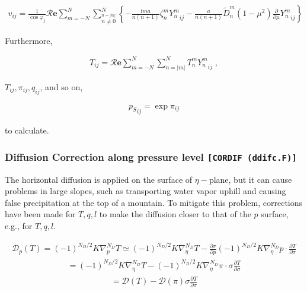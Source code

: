 \begin{eqnarray}
  v_{ij}
  =  \frac{1}{\cos \varphi_j}
     {\mathcal R}{\mathbf{e}} \sum_{m=-N}^{N}
                       \sum_{\stackrel{n=|m|}{n \neq 0}}^{N}
    \left\{
          -  \frac{\mathrm{i}m a}{n(n+1)} \zeta_n^m  {Y_n^m}_{ij}
          -  \frac{a}{n(n+1)} \tilde{D}_n^m
            (1-\mu^{2}) \frac{\partial{}}{\partial {\mu}} {Y_n^m}_{ij}
    \right\}
\end{eqnarray}

Furthermore,

\begin{eqnarray}
  T_{ij}
   =  {\mathcal R}{\mathbf{e}} \sum_{m=-N}^{N} \sum_{n=|m|}^{N}
      T_n^m  {Y_n^m}_{ij} \; ,
\end{eqnarray}

\(T_{ij}, \pi_{ij}, q_{ij}\), and so on,

\begin{eqnarray}
  {p_S}_{ij} = \exp \pi_{ij}
\end{eqnarray}

to calculate.

\hypertarget{diffusion-correction-along-pressure-level-cordif-ddifc.f}{%
\subsubsection{\texorpdfstring{Diffusion Correction along pressure level
\texttt{{[}CORDIF\ (ddifc.F){]}}}{Diffusion Correction along pressure level {[}CORDIF (ddifc.F){]}}}\label{diffusion-correction-along-pressure-level-cordif-ddifc.f}}

The horizontal diffusion is applied on the surface of \(\eta-\)plane,
but it can cause problems in large slopes, such as transporting water
vapor uphill and causing false precipitation at the top of a mountain.
To mitigate this problem, corrections have been made for \(T,q,l\) to
make the diffusion closer to that of the \(p\) surface, e.g., for
\(T,q,l\).

\begin{eqnarray}
  {\mathcal D}_p (T) = (-1)^{N_D/2} K \nabla^{N_D}_p T  
                \simeq  (-1)^{N_D/2} K \nabla^{N_D}_{\eta} T  
                      - \frac{\partial{\sigma}}{\partial {p}} 
                      (-1)^{N_D/2} K \nabla^{N_D}_{\eta} p
                      \cdot \frac{\partial{T}}{\partial {\sigma}}
\end{eqnarray} \begin{eqnarray}
                =      (-1)^{N_D/2} K \nabla^{N_D}_{\eta} T  
                    -  (-1)^{N_D/2} K \nabla^{N_D}_{\eta} \pi
                          \cdot \sigma \frac{\partial{T}}{\partial {\sigma}}
\end{eqnarray} \begin{eqnarray}
                =    {\mathcal D} (T) 
                    -  {\mathcal D} (\pi) 
                       \sigma \frac{\partial{T}}{\partial {\sigma}}
\end{eqnarray}

